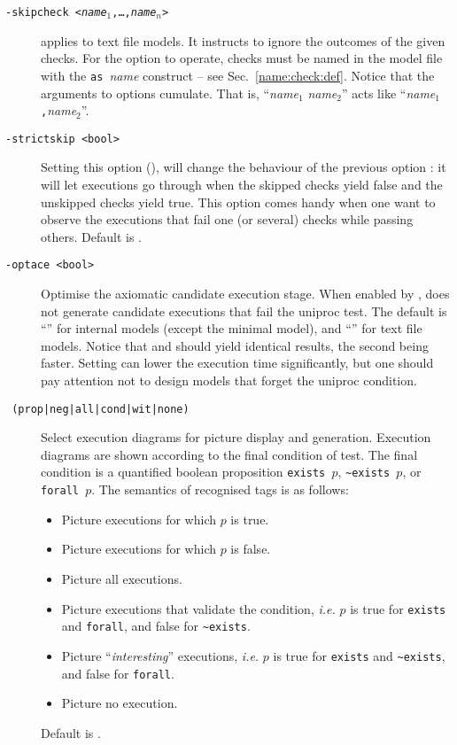 \begin{description}
\item[{\tt -skipcheck <\textit{name}$_1$,\ldots,\textit{name}$_n$>}]
 applies to text file models. It instructs \herd{} to ignore
the outcomes of the given checks. For the option to operate, checks must
be named in the model file with the \texttt{as }\textit{name} construct --
see Sec.~\ref{name:check:def}.
Notice that the arguments to  options cumulate.
That is, ``\textit{name}$_1$ \textit{name}$_2$'' acts like ``\textit{name}$_1$\texttt{,}\textit{name}$_2$''. 

\item [{\tt -strictskip <bool>}] Setting this option (),
will change the behaviour of the previous option :
it will let executions go through when the skipped checks yield
false and the unskipped checks yield true. This option comes handy
when one want to observe the executions that fail one (or several) checks
while passing others. Default is .

\item[{\tt -optace <bool>}] Optimise the axiomatic candidate execution stage.
When enabled by ,  \herd{} does not generate candidate
executions that fail the uniproc test. The default is ``''
for internal models (except the minimal model), and ``'' for
text file models. Notice that 
and  should yield identical results,
the second being faster.
Setting  can lower the execution time significantly,
but one should pay attention not to design models that forget the uniproc
condition.

\item[{\tt {} (prop|neg|all|cond|wit|none)}]
Select execution diagrams for picture display and generation.
Execution diagrams are shown according to
the final condition of test. The final condition is a quantified boolean
proposition \verb+exists +$p$, \verb+~exists +$p$, or \verb+forall +$p$.
The semantics of recognised tags is as follows:
\begin{itemize}
\item {} Picture executions for which $p$ is true.
\item {} Picture executions for which $p$ is false.
\item {}  Picture all executions.
\item {} Picture executions that validate  the condition,
\emph{i.e.} $p$ is true for \verb+exists+ and \verb+forall+, and false
for \verb+~exists+.
\item {} Picture ``\emph{interesting}'' executions,
\emph{i.e.} $p$ is true for \verb+exists+ and \verb+~exists+,
and false for \verb+forall+.
\item {} Picture no  execution.
\end{itemize}
Default is .


\end{description}
